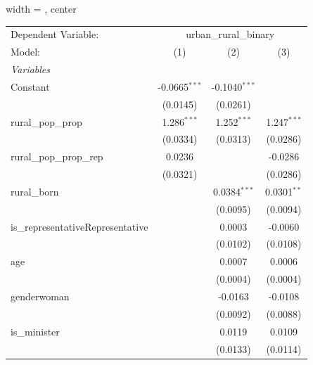 
\begingroup
\centering
\begin{adjustbox}{width = \textwidth, center}
   \begin{tabular}{lccc}
      \tabularnewline \midrule \midrule
      Dependent Variable: & \multicolumn{3}{c}{urban\_rural\_binary}\\
      Model:                            & (1)             & (2)             & (3)\\  
      \midrule
      \emph{Variables}\\
      Constant                          & -0.0665$^{***}$ & -0.1040$^{***}$ &   \\   
                                        & (0.0145)        & (0.0261)        &   \\   
      rural\_pop\_prop                  & 1.286$^{***}$   & 1.252$^{***}$   & 1.247$^{***}$\\   
                                        & (0.0334)        & (0.0313)        & (0.0286)\\   
      rural\_pop\_prop\_rep             & 0.0236          &                 & -0.0286\\   
                                        & (0.0321)        &                 & (0.0286)\\   
      rural\_born                       &                 & 0.0384$^{***}$  & 0.0301$^{**}$\\   
                                        &                 & (0.0095)        & (0.0094)\\   
      is\_representativeRepresentative  &                 & 0.0003          & -0.0060\\   
                                        &                 & (0.0102)        & (0.0108)\\   
      age                               &                 & 0.0007          & 0.0006\\   
                                        &                 & (0.0004)        & (0.0004)\\   
      genderwoman                       &                 & -0.0163         & -0.0108\\   
                                        &                 & (0.0092)        & (0.0088)\\   
      is\_minister                      &                 & 0.0119          & 0.0109\\   
                                        &                 & (0.0133)        & (0.0114)\\   

\end{tabular}
\end{adjustbox}
